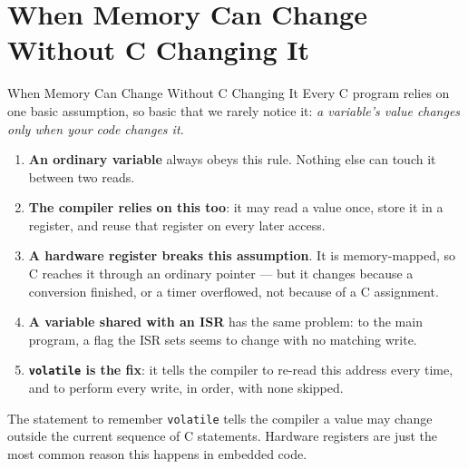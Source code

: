 \documentclass[9pt,aspectratio=169,xcolor=table]{beamer}
\begin{document}
\section{When Memory Can Change Without C Changing It}

\begin{frame}{When Memory Can Change Without C Changing It}
    \leavevmode
    {\small Every C program relies on one basic assumption, so basic
    that we rarely notice it: \emph{a variable's value changes only
    when your code changes it.}}

    \vspace{2mm}
    {\small
    \begin{enumerate}\itemsep2pt
        \item \textbf{An ordinary variable} always obeys this rule.
              Nothing else can touch it between two reads.
        \item \textbf{The compiler relies on this too}: it may read a
              value \alert{once}, store it in a register, and reuse
              that register on every later access.
        \item \textbf{A hardware register breaks this assumption}. It
              is memory-mapped, so C reaches it through an ordinary
              pointer --- but it changes because a conversion
              finished, or a timer overflowed, not because of a C
              assignment.
        \item \textbf{A variable shared with an ISR} has the same
              problem: to the main program, a flag the ISR sets seems
              to change with no matching write.
        \item \textbf{\texttt{volatile} is the fix}: it tells the
              compiler to re-read this address every time, and to
              perform every write, in order, with none skipped.
    \end{enumerate}}

    \vspace{2mm}
    \begin{block}{The statement to remember}
        \texttt{volatile} tells the compiler a value may change
        \alert{outside the current sequence of C statements}. Hardware
        registers are just the most common reason this happens in
        embedded code.
    \end{block}
\end{frame}
\end{document}
